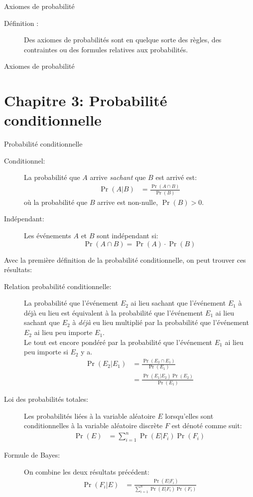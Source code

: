 \documentclass[10pt, french]{article}
\begin{document}
\begin{multicols*}{3}
\begin{axioms}{Axiomes de probabilité}
\begin{description}
  \item[Définition :] Des axiomes de probabilités sont en quelque sorte des règles, des contraintes ou des formules relatives aux probabilités.
\end{description}
\end{axioms}{Axiomes de probabilité}

\pagebreak
\section{Chapitre 3: Probabilité conditionnelle}
\begin{probch3}{Probabilité conditionnelle}
\begin{description}
	\item[Conditionnel:]	La probabilité que $A$ arrive \textit{sachant} que $B$ est arrivé est: 
	\begin{align*}
		\Pr(A | B) 
		&= 	\frac{\Pr(A \cap B)}{\Pr(B)}	
	\end{align*}
	où la probabilité que $B$ arrive est non-nulle, $\Pr(B) > 0$.
	\item[Indépendant:]	Les événements $A$ et $B$ sont indépendant si:
	\begin{equation*}
		\Pr(A \cap B) = \Pr(A) \cdot \Pr(B)
	\end{equation*}
\end{description}
Avec la première définition de la probabilité conditionnelle, on peut trouver ces résultats:
\begin{description}
	\item[Relation probabilité conditionnelle: ]	La probabilité que l'événement $E_{2}$ ai lieu sachant que l'événement $E_{1}$ à déjà eu lieu est équivalent à la probabilité que l'événement $E_{1}$ ai lieu sachant que $E_{2}$ à \textit{déjà} eu lieu multiplié par la probabilité que l'événement $E_{2}$ ai lieu peu importe $E_{1}$. \\
	Le tout est encore pondéré par la probabilité que l'événement $E_{1}$ ai lieu peu importe si $E_{2}$ y a.
	\begin{align*}
		\Pr(E_{2} | E_{1})
		&= 	\frac{\Pr(E_{2} \cap E_{1})}{\Pr(E_{1})}		\\
		&=	\frac{\Pr(E_{1} | E_{2}) \Pr(E_{2})}{\Pr(E_{1})}		
	\end{align*}
	\item[Loi des probabilités totales: ]	Les probabilités liées à la variable aléatoire $E$ lorsqu'elles sont conditionnelles à la variable aléatoire discrète $F$ est dénoté comme suit:
	\begin{align*}
		\Pr(E)	&=	\sum_{i = 1}^{n} \Pr(E | F_{i}) \Pr(F_{i})
	\end{align*}
	\item[Formule de Bayes: ]	On combine les deux résultats précédent:
	\begin{align*}
		\Pr(F_{i} | E)
		&=	\frac{\Pr(E | F_{i})}{\sum_{i = 1}^{n} \Pr(E | F_{i}) \Pr(F_{i})}
	\end{align*}
\end{description}
\end{probch3}

\end{multicols*}
\end{document}
